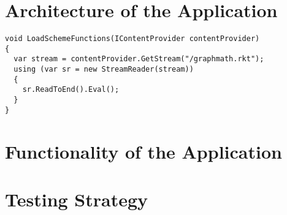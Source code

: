 \documentclass[12pt]{article}
\begin{document}
	\section{Architecture of the Application}
		
	\begin{lstlisting}
void LoadSchemeFunctions(IContentProvider contentProvider)
{
  var stream = contentProvider.GetStream("/graphmath.rkt");
  using (var sr = new StreamReader(stream))
  {
    sr.ReadToEnd().Eval();
  }
}
	\end{lstlisting}
	
	\section{Functionality of the Application}
	
	\section{Testing Strategy}	
	
\end{document}

